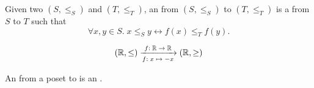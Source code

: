 
\begin{frame}{}
\end{frame}

\begin{frame}{}
  \begin{definition}
    Given two  $(S, \le_{S})$ and $(T, \le_{T})$,
    an  from $(S, \le_{S})$ to $(T, \le_{T})$
    is a  from $S$ to $T$ such that
    \[
      \forall x, y \in S.\; x \le_{S} y \leftrightarrow f(x) \le_{T} f(y).
    \]
  \end{definition}

  \pause
  \[
    (\mathbb{R}, \le) \xrightarrow[f:\; x \;\mapsto\; -x]{f:\; \mathbb{R} \;\to\; \mathbb{R}} (\mathbb{R}, \ge)
  \]

  \pause
  \vspace{0.30cm}
  \begin{definition}
    An  from a poset to 
    is an .
  \end{definition}
\end{frame}
